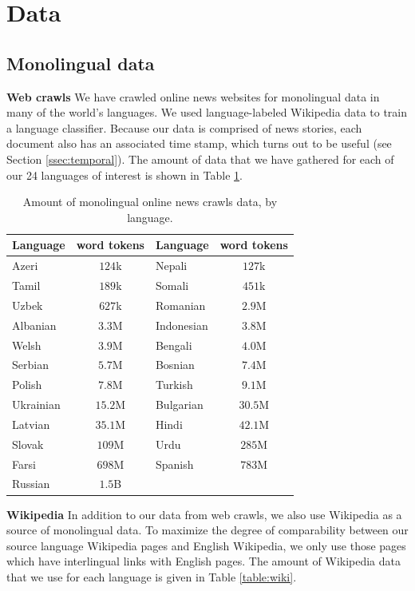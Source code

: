 \documentclass[11pt]{article}
\begin{document}
\section{Data}
\subsection{Monolingual data}
{\bf Web crawls} We have crawled online news websites for monolingual data in many of the world's languages. We used language-labeled Wikipedia data to train a language classifier. Because our data is comprised of news stories, each document also has an associated time stamp, which turns out to be useful (see Section \ref{ssec:temporal}). The amount of data that we have gathered for each of our 24 languages of interest is shown in Table \ref{table:crawls}.

\begin{table}\footnotesize
\begin{center}
\begin{tabular}{|l|c|l|c|}
\hline
Language & word tokens & Language & word tokens \\
\hline
Azeri & $124$k & Nepali & $127$k \\
Tamil & $189$k & Somali & $451$k \\
Uzbek & $627$k & Romanian & $2.9$M \\
Albanian & $3.3$M & Indonesian & $3.8$M \\
Welsh & $3.9$M & Bengali & $4.0$M \\
Serbian & $5.7$M & Bosnian & $7.4$M \\
Polish & $7.8$M & Turkish & $9.1$M \\
Ukrainian & $15.2$M & Bulgarian & $30.5$M \\
Latvian & $35.1$M & Hindi & $42.1$M \\
Slovak & $109$M & Urdu & $285$M \\
Farsi & $698$M & Spanish & $783$M \\
Russian & $1.5$B & &\\
\hline
\end{tabular}
\end{center}
\caption{\label{table:crawls}Amount of monolingual online news crawls data, by language.}
\end{table}


{\bf Wikipedia} In addition to our data from web crawls, we also use Wikipedia as a source of monolingual data. To maximize the degree of comparability between our source language Wikipedia pages and English Wikipedia, we only use those pages which have interlingual links with English pages. The amount of Wikipedia data that we use for each language is given in Table \ref{table:wiki}.
\end{document}
